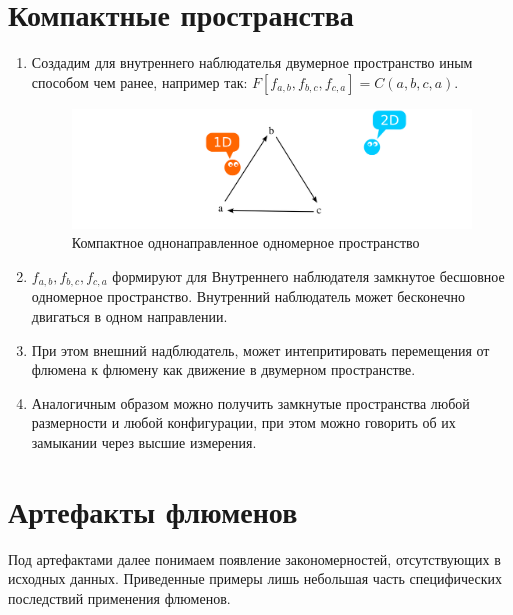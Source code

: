\documentclass[final]{article}
\begin{document}
    \section{Компактные пространства}
        \begin{enumerate}

            \item Создадим для внутреннего наблюдателья двумерное пространство иным 
            способом чем ранее, например так: \( F[f_{a,b},f_{b,c},f_{c,a}] = C(a,b,c,a) \).

            \begin{figure}[H]
                \centering
                \includegraphics[width=\textwidth]{./2d-f1f2f3-loop.png}
                \caption{Компактное однонаправленное одномерное пространство}
                \label{fig:image}
            \end{figure}

            \item \(f_{a,b},f_{b,c},f_{c,a}\) формируют для Внутреннего наблюдателя 
            замкнутое бесшовное одномерное пространство. Внутренний наблюдатель может 
            бесконечно двигаться в одном направлении.

            \item При этом внешний надблюдатель, может интепритировать перемещения 
            от флюмена к флюмену как движение в двумерном пространстве.

            \item Аналогичным образом можно получить замкнутые пространства любой 
            размерности и любой конфигурации, при этом можно говорить об их замыкании 
            через высшие измерения.

        \end{enumerate}



    \section{Артефакты флюменов}
        
        Под артефактами далее понимаем появление закономерностей, отсутствующих 
        в исходных данных. Приведенные примеры лишь небольшая часть 
        специфических последствий применения флюменов.
\end{document}
